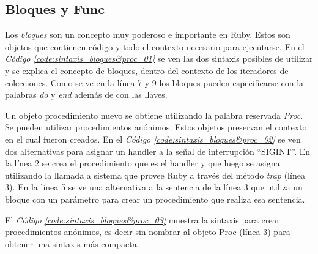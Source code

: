 \documentclass{article}
\newcommand{\refcode}[1]{\textit{Código \ref{#1}}}
\begin{document}
\subsection{Bloques y Func}

Los \textit{bloques} son un concepto muy poderoso e importante en Ruby. Estos son objetos que contienen código y todo el contexto necesario para ejecutarse.
En el \refcode{code:sintaxis_bloques&proc_01} se ven las dos sintaxis posibles de utilizar y se explica el concepto de bloques, dentro del contexto de los iteradores de colecciones. Como se ve en la línea 7 y 9 los bloques pueden especificarse con la palabras \textit{do} y \textit{end} además de con las llaves.
\bigskip

 
\bigskip\bigskip

Un objeto procedimiento nuevo se obtiene utilizando la palabra reservada \textit{Proc}. Se pueden utilizar procedimientos anónimos. Estos objetos preservan el contexto en el cual fueron creados.
En el \refcode{code:sintaxis_bloques&proc_02} se ven dos alternativas para asignar un handler a la señal de interrupción “SIGINT”. En la línea 2 se crea el procedimiento que es el handler y que luego se asigna utilizando la llamada a sistema que provee Ruby a través del método \textit{trap} (línea 3). En la línea 5 se ve una alternativa a la sentencia de la línea 3 que utiliza un bloque con un parámetro para crear un procedimiento que realiza esa sentencia. 
\bigskip\bigskip


\bigskip\bigskip

El \refcode{code:sintaxis_bloques&proc_03} muestra la sintaxis para crear procedimientos anónimos, es decir sin nombrar al objeto Proc (línea 3) para obtener una sintaxis más compacta.

 
\bigskip\bigskip
\end{document}
